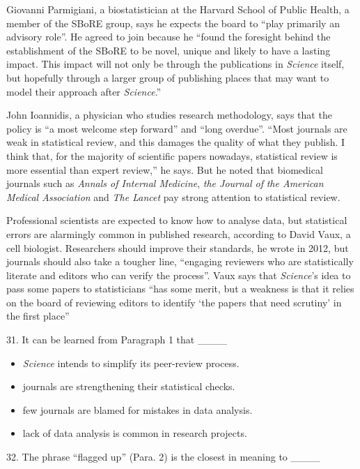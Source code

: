 \documentclass[UTF8,11pt]{ctexart}
\begin{document}
Giovanni Parmigiani, a biostatistician at the Harvard School of Public Health, a member of the SBoRE group, says he expects the board to “play primarily an advisory role”. He agreed to join because he “found the foresight behind the establishment of the SBoRE to be novel, unique and likely to have a lasting impact. This impact will not only be through the publications in \textit{Science} itself, but hopefully through a larger group of publishing places that may want to model their approach after \textit{Science}.”


John Ioannidis, a physician who studies research methodology, says that the policy is “a most welcome step forward” and “long overdue”. “Most journals are weak in statistical review, and this damages the quality of what they publish. I think that, for the majority of scientific papers nowadays, statistical review is more essential than expert review,” he says. But he noted that biomedical journals such as \textit{Annals of Internal Medicine}, \textit{the Journal of} \textit{the American Medical Association} and \textit{The Lancet} pay strong attention to statistical review.


Professional scientists are expected to know how to analyse data, but statistical errors are alarmingly common in published research, according to David Vaux, a cell biologist. Researchers should improve their standards, he wrote in 2012, but journals should also take a tougher line, “engaging reviewers who are statistically literate and editors who can verify the process”. Vaux says that \textit{Science}’s idea to pass some papers to statisticians “has some merit, but a weakness is that it relies on the board of reviewing editors to identify ‘the papers that need scrutiny’ in the first place”


31. It can be learned from Paragraph 1 that \_\_\_\_


\begin{itemize}[leftmargin=2em,itemsep=.2em,topsep=.4em]\item[A.] \textit{Science} intends to simplify its peer-review process.
\item[B.] journals are strengthening their statistical checks.
\item[C.] few journals are blamed for mistakes in data analysis.
\item[D.] lack of data analysis is common in research projects.
\end{itemize}

32. The phrase “flagged up” (Para. 2) is the closest in meaning to \_\_\_\_
\end{document}
